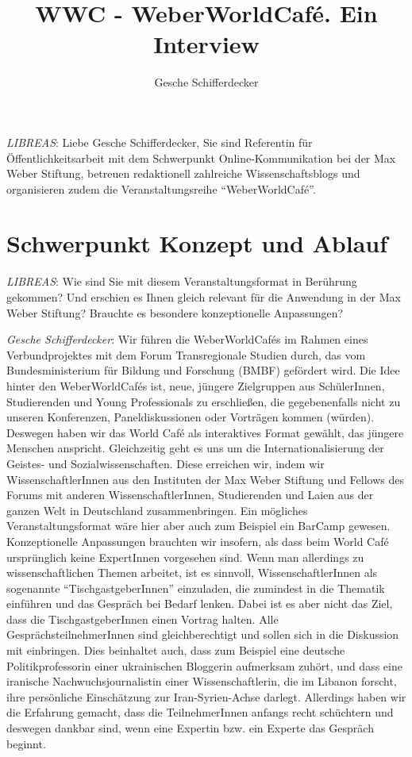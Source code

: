 \documentclass[a4paper,
fontsize=11pt,
oneside,
numbers=noperiodatend,
parskip=half-,
bibliography=totoc,
final
]{scrartcl}
\title{\LARGE{WWC - WeberWorldCafé. Ein Interview}} %
\author{Gesche Schifferdecker} %
\date{}
\begin{document}
\maketitle
\thispagestyle{fancyplain} 


\emph{LIBREAS}: Liebe Gesche Schifferdecker, Sie sind Referentin für
Öffentlichkeitsarbeit mit dem Schwerpunkt Online-Kommunikation bei der
Max Weber Stiftung, betreuen redaktionell zahlreiche Wissenschaftsblogs
und organisieren zudem die Veranstaltungsreihe \enquote{WeberWorldCafé}.

\section*{Schwerpunkt Konzept und
Ablauf}\label{schwerpunkt-konzept-und-ablauf}

\emph{LIBREAS}: Wie sind Sie mit diesem Veranstaltungsformat in
Berührung gekommen? Und erschien es Ihnen gleich relevant für die
Anwendung in der Max Weber Stiftung? Brauchte es besondere
konzeptionelle Anpassungen?

\emph{Gesche Schifferdecker}: Wir führen die WeberWorldCafés im Rahmen
eines Verbundprojektes mit dem Forum Transregionale Studien durch, das
vom Bundesministerium für Bildung und Forschung (BMBF) gefördert wird.
Die Idee hinter den WeberWorldCafés ist, neue, jüngere Zielgruppen aus
SchülerInnen, Studierenden und Young Professionals zu erschließen, die
gegebenenfalls nicht zu unseren Konferenzen, Paneldiskussionen oder
Vorträgen kommen (würden). Deswegen haben wir das World Café als
interaktives Format gewählt, das jüngere Menschen anspricht.
Gleichzeitig geht es uns um die Internationalisierung der Geistes- und
Sozialwissenschaften. Diese erreichen wir, indem wir
WissenschaftlerInnen aus den Instituten der Max Weber Stiftung und
Fellows des Forums mit anderen WissenschaftlerInnen, Studierenden und
Laien aus der ganzen Welt in Deutschland zusammenbringen. Ein mögliches
Veranstaltungsformat wäre hier aber auch zum Beispiel ein BarCamp
gewesen. Konzeptionelle Anpassungen brauchten wir insofern, als dass
beim World Café ursprünglich keine ExpertInnen vorgesehen sind. Wenn man
allerdings zu wissenschaftlichen Themen arbeitet, ist es sinnvoll,
WissenschaftlerInnen als sogenannte \enquote{TischgastgeberInnen}
einzuladen, die zumindest in die Thematik einführen und das Gespräch bei
Bedarf lenken. Dabei ist es aber nicht das Ziel, dass die
TischgastgeberInnen einen Vortrag halten. Alle GesprächsteilnehmerInnen
sind gleichberechtigt und sollen sich in die Diskussion mit einbringen.
Dies beinhaltet auch, dass zum Beispiel eine deutsche Politikprofessorin
einer ukrainischen Bloggerin aufmerksam zuhört, und dass eine iranische
Nachwuchsjournalistin einer Wissenschaftlerin, die im Libanon forscht,
ihre persönliche Einschätzung zur Iran-Syrien-Achse darlegt. Allerdings
haben wir die Erfahrung gemacht, dass die TeilnehmerInnen anfangs recht
schüchtern und deswegen dankbar sind, wenn eine Expertin bzw. ein
Experte das Gespräch beginnt.
\end{document}
